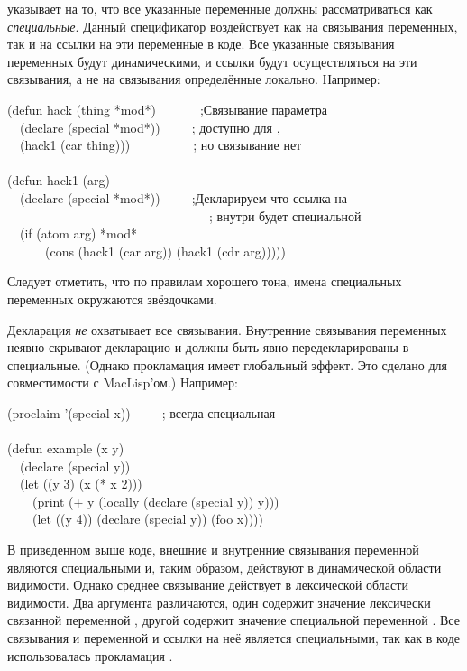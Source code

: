 \begin{flushdesc}
\item[\cdf{special}]
 указывает на то, что все указанные
переменные должны рассматриваться как \emph{специальные}.
Данный спецификатор воздействует как на связывания переменных, так и на ссылки
на эти переменные в коде.
Все указанные связывания переменных будут динамическими, и ссылки будут
осуществляться на эти связывания, а не на связывания определённые локально.
Например:
\begin{lisp}
(defun hack (thing *mod*)~~~~~~~;\textrm{Связывание параметра} \\
~~(declare (special *mod*))~~~~~; \textrm{ доступно для ,} \\
~~(hack1 (car thing)))~~~~~~~~~~; \textrm{но связывание  нет} \\
 \\
(defun hack1 (arg) \\
~~(declare (special *mod*))~~~~~;\textrm{Декларируем что ссылка на } \\
~~~~~~~~~~~~~~~~~~~~~~~~~~~~~~~~; \textrm{внутри  будет специальной} \\
~~(if (atom arg) *mod* \\
~~~~~~(cons (hack1 (car arg)) (hack1 (cdr arg)))))
\end{lisp}
Следует отметить, что по правилам хорошего тона, имена специальных переменных
окружаются звёздочками.

Декларация  \emph{не} охватывает все связывания.
Внутренние связывания переменных неявно скрывают декларацию  и
должны быть явно передекларированы в специальные.
(Однако прокламация  имеет глобальный эффект. Это сделано для
совместимости с MacLisp'ом.)
Например:
\begin{lisp}
(proclaim '(special x))~~~~~;\textrm{ всегда специальная} \\
 \\
(defun example (x y) \\
~~(declare (special y)) \\
~~(let ((y 3) (x (* x 2))) \\
~~~~(print (+ y (locally (declare (special y)) y))) \\
~~~~(let ((y 4)) (declare (special y)) (foo x))))
\end{lisp}
В приведенном выше коде, внешние и внутренние связывания переменной 
являются специальными и, таким образом, действуют в динамической области
видимости. Однако среднее связывание действует в лексической области
видимости. Два аргумента \cdf{+} различаются, один содержит значение 
лексически связанной переменной , другой содержит значение специальной
переменной .
Все связывания и переменной  и ссылки на неё является специальными,
так как в коде использовалась прокламация .


\end{flushdesc}
